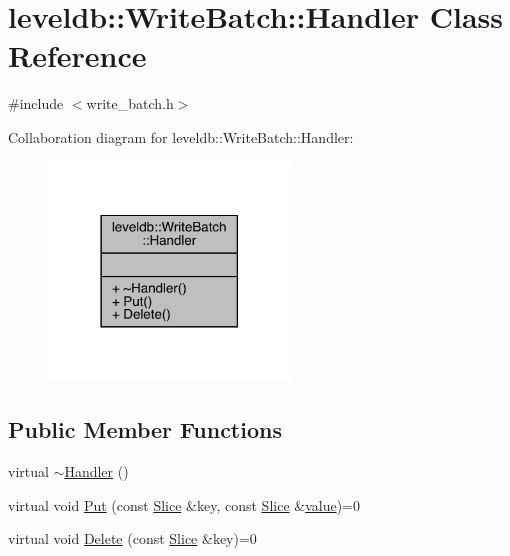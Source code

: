 \hypertarget{classleveldb_1_1_write_batch_1_1_handler}{}\section{leveldb\+::Write\+Batch\+::Handler Class Reference}
\label{classleveldb_1_1_write_batch_1_1_handler}


{\ttfamily \#include $<$write\+\_\+batch.\+h$>$}



Collaboration diagram for leveldb\+::Write\+Batch\+::Handler\+:
\nopagebreak
\begin{figure}[H]
\begin{center}
\leavevmode
\includegraphics[width=182pt]{classleveldb_1_1_write_batch_1_1_handler__coll__graph}
\end{center}
\end{figure}
\subsection*{Public Member Functions}
\begin{DoxyCompactItemize}
\item 
virtual \mbox{\hyperlink{classleveldb_1_1_write_batch_1_1_handler_a85fd79c7fb47ef448719379499c5d090}{$\sim$\+Handler}} ()
\item 
virtual void \mbox{\hyperlink{classleveldb_1_1_write_batch_1_1_handler_ad41d4985db289b94e29921167d206d4b}{Put}} (const \mbox{\hyperlink{classleveldb_1_1_slice}{Slice}} \&key, const \mbox{\hyperlink{classleveldb_1_1_slice}{Slice}} \&\mbox{\hyperlink{version__set_8cc_a38c8b88c432e666ad10b0c5573e1160a}{value}})=0
\item 
virtual void \mbox{\hyperlink{classleveldb_1_1_write_batch_1_1_handler_aeab6526b87bf5b50fb64216b69b34b17}{Delete}} (const \mbox{\hyperlink{classleveldb_1_1_slice}{Slice}} \&key)=0
\end{DoxyCompactItemize}


